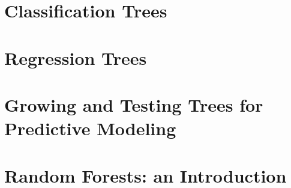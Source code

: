 \documentclass[]{book}
\begin{document}
\chapter{Classification Trees}\label{classification-trees}

\chapter{Regression Trees}\label{regression-trees}

\chapter{Growing and Testing Trees for Predictive
Modeling}\label{growing-and-testing-trees-for-predictive-modeling}

\chapter{Random Forests: an Introduction}\label{randomforests}


\end{document}
